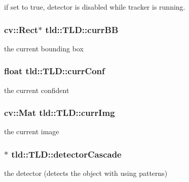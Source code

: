 if set to true, detector is disabled while tracker is running. 

\hypertarget{classtld_1_1TLD_a5af4bc9d8fa64c4423b294f727c4ba55}{
\subsubsection[{curr\-B\-B}]{\setlength{\rightskip}{0pt plus 5cm}cv\-::\-Rect$\ast$ tld\-::\-T\-L\-D\-::curr\-B\-B}}\label{classtld_1_1TLD_a5af4bc9d8fa64c4423b294f727c4ba55}


the current bounding box 

\hypertarget{classtld_1_1TLD_ab2e815db72cb2f40a7864c4d4457eb34}{
\subsubsection[{curr\-Conf}]{\setlength{\rightskip}{0pt plus 5cm}float tld\-::\-T\-L\-D\-::curr\-Conf}}\label{classtld_1_1TLD_ab2e815db72cb2f40a7864c4d4457eb34}


the current confident 

\hypertarget{classtld_1_1TLD_a7bb2c3271567719afb2f97e5953c31d5}{
\subsubsection[{curr\-Img}]{\setlength{\rightskip}{0pt plus 5cm}cv\-::\-Mat tld\-::\-T\-L\-D\-::curr\-Img}}\label{classtld_1_1TLD_a7bb2c3271567719afb2f97e5953c31d5}


the current image 

\hypertarget{classtld_1_1TLD_abe59bf99d46b55f6ef402cb48f9d290b}{
\subsubsection[{detector\-Cascade}]{$\ast$ tld\-::\-T\-L\-D\-::detector\-Cascade}}\label{classtld_1_1TLD_abe59bf99d46b55f6ef402cb48f9d290b}


the detector (detects the object with using patterns) 

